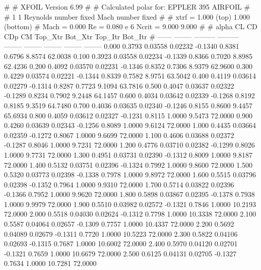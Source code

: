 #  
#       XFOIL         Version 6.99
#  
# Calculated polar for: EPPLER 395 AIRFOIL                              
#  
# 1 1 Reynolds number fixed          Mach number fixed         
#  
# xtrf =   1.000 (top)        1.000 (bottom)  
# Mach =   0.000     Re =     0.080 e 6     Ncrit =   9.000  9.000
#  
#   alpha    CL        CD       CDp       CM     Top_Xtr  Bot_Xtr  Top_Itr  Bot_Itr
#  ------ -------- --------- --------- -------- -------- -------- -------- --------
   0.000   0.3793   0.03558   0.02232  -0.1340   0.8381   0.6796   8.8574  62.0038
   0.100   0.3923   0.03558   0.02234  -0.1339   0.8366   0.7020   8.8985  62.4236
   0.200   0.4092   0.03570   0.02231  -0.1346   0.8352   0.7306   8.9379  62.9600
   0.300   0.4229   0.03574   0.02221  -0.1344   0.8339   0.7582   8.9751  63.5042
   0.400   0.4119   0.03614   0.02279  -0.1314   0.8287   0.7723   9.1094  63.7816
   0.500   0.4047   0.03637   0.02322  -0.1289   0.8234   0.7902   9.2448  64.1457
   0.600   0.4034   0.03642   0.02339  -0.1268   0.8192   0.8185   9.3519  64.7480
   0.700   0.4036   0.03635   0.02340  -0.1246   0.8155   0.8600   9.4457  65.6934
   0.800   0.4059   0.03612   0.02327  -0.1231   0.8115   1.0000   9.5473  72.0000
   0.900   0.4260   0.03639   0.02343  -0.1256   0.8089   1.0000   9.6124  72.0000
   1.000   0.4435   0.03664   0.02359  -0.1272   0.8067   1.0000   9.6699  72.0000
   1.100   0.4606   0.03688   0.02372  -0.1287   0.8046   1.0000   9.7231  72.0000
   1.200   0.4776   0.03710   0.02382  -0.1299   0.8026   1.0000   9.7731  72.0000
   1.300   0.4951   0.03731   0.02390  -0.1312   0.8009   1.0000   9.8187  72.0000
   1.400   0.5132   0.03751   0.02396  -0.1324   0.7992   1.0000   9.8600  72.0000
   1.500   0.5320   0.03773   0.02398  -0.1338   0.7978   1.0000   9.8972  72.0000
   1.600   0.5515   0.03796   0.02398  -0.1352   0.7964   1.0000   9.9310  72.0000
   1.700   0.5714   0.03822   0.02396  -0.1366   0.7952   1.0000   9.9620  72.0000
   1.800   0.5898   0.03867   0.02395  -0.1378   0.7938   1.0000   9.9979  72.0000
   1.900   0.5510   0.03982   0.02572  -0.1321   0.7846   1.0000  10.2193  72.0000
   2.000   0.5518   0.04030   0.02624  -0.1312   0.7798   1.0000  10.3338  72.0000
   2.100   0.5587   0.04064   0.02657  -0.1309   0.7757   1.0000  10.4337  72.0000
   2.200   0.5692   0.04089   0.02679  -0.1311   0.7720   1.0000  10.5223  72.0000
   2.300   0.5822   0.04106   0.02693  -0.1315   0.7687   1.0000  10.6002  72.0000
   2.400   0.5970   0.04120   0.02701  -0.1321   0.7659   1.0000  10.6679  72.0000
   2.500   0.6125   0.04131   0.02705  -0.1327   0.7634   1.0000  10.7281  72.0000
